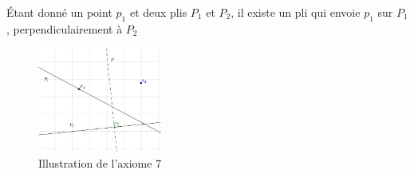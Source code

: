 \documentclass[a4paper,12pt,french]{report}
\begin{document}
		
		\begin{axiome}
			Étant donné un point $p_{1}$ et deux plis $P_{1}$ et $P_{2}$, il existe un pli qui envoie $p_{1}$ sur $P_{1}$, perpendiculairement à $P_{2}$
		\end{axiome}
		\begin{figure}[h]
		    \begin{center}
			\includegraphics[height=130px]{media/Ax7.eps}
		    \end{center}
			\caption{Illustration de l'axiome 7}
		\end{figure}
\end{document}
